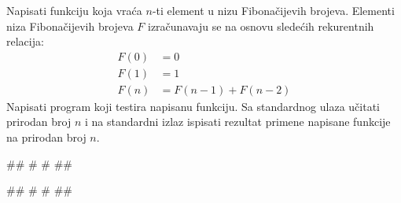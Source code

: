 \begin{Exercise}[label=1_20]
Napisati funkciju koja vraća $n$-ti element u nizu Fibonačijevih brojeva. Elementi niza Fibonačijevih brojeva $F$ izračunavaju se na osnovu sledećih rekurentnih relacija:
\begin{align*}
 F(0) &= 0\\
 F(1) &= 1\\
 F(n) &= F(n-1) + F(n-2)
\end{align*}
Napisati program koji testira napisanu funkciju. Sa standardnog ulaza učitati prirodan broj $n$ i na standardni izlaz ispisati rezultat primene napisane funkcije na prirodan broj $n$.

\begin{miditest}
\begin{upotreba}{1}
#\naslovInt#
# #
##
\end{upotreba}
\end{miditest}
\begin{miditest}
\begin{upotreba}{2}
#\naslovInt#
# #
##
\end{upotreba}
\end{miditest}

\end{Exercise}

